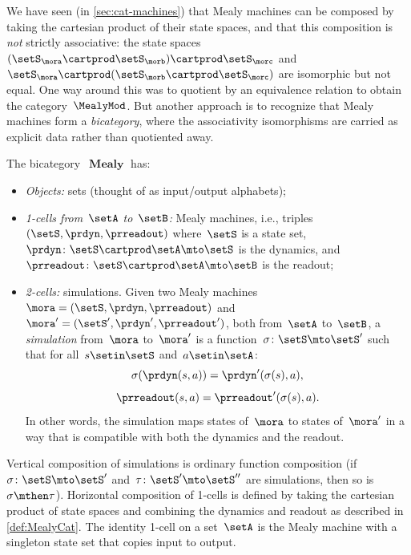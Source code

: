 \begin{example}
    \label{exa:bicat-mealy}
    We have seen (in \cref{sec:cat-machines}) that Mealy machines can be composed by taking the cartesian product of their state spaces, and that this composition is \emph{not} strictly associative: the state spaces~$(\setS_\mora \cartprod \setS_\morb) \cartprod \setS_\morc$ and~$\setS_\mora \cartprod (\setS_\morb \cartprod \setS_\morc)$ are isomorphic but not equal.
    One way around this was to quotient by an equivalence relation to obtain the category~$\MealyMod$.
    But another approach is to recognize that Mealy machines form a \emph{bicategory}, where the associativity isomorphisms are carried as explicit data rather than quotiented away.

    The bicategory~$\operatorname{\textbf{Mealy}}$ has:
    \begin{itemize}
        \item \emph{Objects:} sets (thought of as input/output alphabets);
        \item \emph{1-cells from~$\setA$ to~$\setB$:} Mealy machines, i.e., triples~$(\setS, \prdyn, \prreadout)$ where~$\setS$ is a state set, $\prdyn \colon \setS \cartprod \setA \mto \setS$ is the dynamics, and~$\prreadout \colon \setS \cartprod \setA \mto \setB$ is the readout;
        \item \emph{2-cells:} simulations.
              Given two Mealy machines~$\mora = (\setS, \prdyn, \prreadout)$ and~$\mora' = (\setS', \prdyn', \prreadout')$, both from~$\setA$ to~$\setB$, a \emph{simulation} from~$\mora$ to~$\mora'$ is a function~$\sigma \colon \setS \mto \setS'$ such that for all~$s \setin \setS$ and~$a \setin \setA$:
              \begin{equation}\label{eq:mealy-simulation-dyn}
                  \sigma(\prdyn(s, a)) = \prdyn'(\sigma(s), a),
              \end{equation}
              \begin{equation}\label{eq:mealy-simulation-ro}
                  \prreadout(s, a) = \prreadout'(\sigma(s), a).
              \end{equation}
              In other words, the simulation maps states of~$\mora$ to states of~$\mora'$ in a way that is compatible with both the dynamics and the readout.
    \end{itemize}
    Vertical composition of simulations is ordinary function composition (if~$\sigma \colon \setS \mto \setS'$ and~$\tau \colon \setS' \mto \setS''$ are simulations, then so is~$\sigma \mthen \tau$).
    Horizontal composition of 1-cells is defined by taking the cartesian product of state spaces and combining the dynamics and readout as described in \cref{def:MealyCat}.
    The identity 1-cell on a set~$\setA$ is the Mealy machine with a singleton state set that copies input to output.


\end{example}

